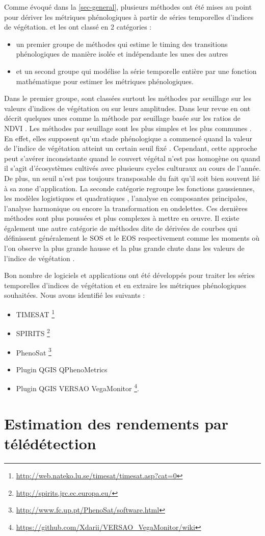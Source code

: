 Comme évoqué dans la \cref{sec-general}, plusieurs méthodes ont été mises au point pour dériver les métriques phénologiques à partir de séries temporelles d'indices de végétation.
\citet{Beck2006} et \citet{Atzberger2013} les ont classé en 2 catégories : 
\begin{itemize}
 \item un premier groupe de méthodes qui estime le timing des transitions phénologiques de manière isolée et indépendante les unes des autres
 \item et un second groupe qui modélise la série temporelle entière par une fonction mathématique pour estimer les métriques phénologiques.
\end{itemize}
Dans le premier groupe, sont classées surtout les méthodes par seuillage sur les valeurs d'indices de végétation ou sur leurs amplitudes. Dans leur revue \citet{deBeurs2010} en ont décrit quelques unes comme la méthode par seuillage basée sur les ratios de NDVI \citep{White1997}. Les méthodes par seuillage sont les plus simples et les plus communes \citep{Pan2015}. En effet, elles supposent qu’un stade phénologique a commencé quand 
la valeur de l'indice de végétation atteint un certain seuil fixé \citep{Jonsson2002}. Cependant, cette approche peut s'avérer inconsistante quand le couvert végétal n'est 
pas homogène ou quand il s'agit d'écosystèmes cultivés avec plusieurs cycles culturaux au cours de l'année. De plus, un seuil n'est pas toujours transposable du fait qu'il soit bien souvent lié à sa zone d'application. La seconde catégorie regroupe les fonctions gaussiennes, les modèles logistiques et quadratiques \citep{Zhang2003,Jonsson2004}, l'analyse en composantes principales, l'analyse harmonique ou encore la transformation en ondelettes. Ces dernières méthodes sont plus poussées et plus complexes à mettre en \oe uvre. Il existe également une autre catégorie de méthodes dite de dérivées de courbes qui définissent généralement le SOS et le EOS respectivement comme les moments où l'on observe la plus grande hausse et la plus grande chute dans les valeurs de l'indice de végétation \citep{Moulin1997,Tateishi2004}.

\vspace{5mm}

Bon nombre de logiciels et applications ont été développés pour traiter les séries temporelles d'indices de végétation et en extraire les métriques phénologiques souhaitées. 
Nous avons identifié les suivants :
\begin{itemize}
 \item TIMESAT \footnote{\url{http://web.nateko.lu.se/timesat/timesat.asp?cat=0}} \citep{Eklundh2017} 
 \item SPIRITS \footnote{\url{http://spirits.jrc.ec.europa.eu/}}
 \item PhenoSat \footnote{\url{http://www.fc.up.pt/PhenoSat/software.html}} \citep{Rodrigues2013}
 \item Plugin QGIS QPhenoMetrics \citep{Duarte2018}
 \item Plugin QGIS VERSAO VegaMonitor \footnote{\url{https://github.com/Xdarii/VERSAO_VegaMonitor/wiki}}.
\end{itemize}

\section{Estimation des rendements par télédétection}
